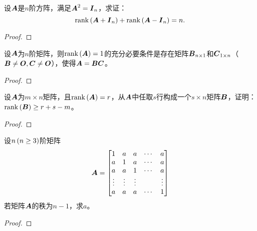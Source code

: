 \begin{problem}\label{problem-1.28}
设\(\boldsymbol{A}\)是\(n\)阶方阵，满足\(\boldsymbol{A}^2=\boldsymbol{I}_n\)，求证：
\begin{equation*}
    \mathrm{rank}\left( \boldsymbol{A}+\boldsymbol{I}_n \right)+\mathrm{rank}\left( \boldsymbol{A}-\boldsymbol{I}_n \right)=n.
\end{equation*}
\end{problem}
\begin{proof}

\end{proof}

\begin{problem}\label{problem-1.29}
设\(\boldsymbol{A}\)为\(n\)阶矩阵，则\(\mathrm{rank}\left( \boldsymbol{A} \right)=1\)的充分必要条件是存在矩阵\(\boldsymbol{B}_{n\times1}\)和\(\boldsymbol{C}_{1\times n}\)（\(\boldsymbol{B}\neq\boldsymbol{O},\boldsymbol{C}\neq\boldsymbol{O}\)），使得\(\boldsymbol{A}=\boldsymbol{B}\boldsymbol{C}\)。
\end{problem}
\begin{proof}

\end{proof}

\begin{problem}\label{problem-1.30}
设\(\boldsymbol{A}\)为\(m\times n\)矩阵，且\(\mathrm{rank}\left( \boldsymbol{A} \right)=r\)，从\(\boldsymbol{A}\)中任取\(s\)行构成一个\(s\times n\)矩阵\(\boldsymbol{B}\)，证明：\(\mathrm{rank}\left( \boldsymbol{B} \right)\ge r+s-m\)。
\end{problem}
\begin{proof}

\end{proof}

\begin{problem}\label{problem-1.31}
设\(n\left( n\ge3 \right)\)阶矩阵
\begin{equation*}
    \boldsymbol{A}=
    \begin{bmatrix}
        1      & a      & a      & \cdots & a      \\
        a      & 1      & a      & \cdots & a      \\
        a      & a      & 1      & \cdots & a      \\
        \vdots & \vdots & \vdots &        & \vdots \\
        a      & a      & a      & \cdots & 1
    \end{bmatrix}
\end{equation*}
若矩阵\(\boldsymbol{A}\)的秩为\(n-1\)，求\(a\)。
\end{problem}
\begin{proof}

\end{proof}

